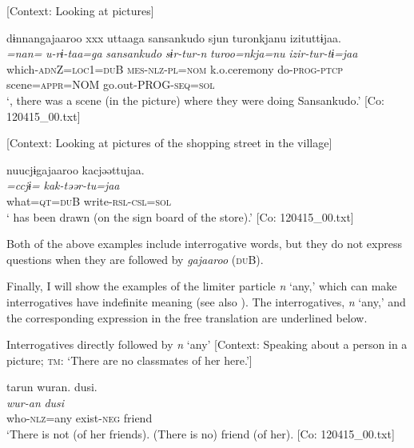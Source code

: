 \ea \label{ex:5:40}  \ea \label{ex:5:40a} [Context: Looking at pictures]

\glll  dɨnnangajaaroo  xxx  uttaaga  {\textbar}sansankudo{\textbar}   sjun  turonkjanu  izituttɨjaa.\footnotemark\\
\textit{=nan=}    \textit{u-rɨ-taa=ga}  \textit{sansankudo}   \textit{sɨr-tur-n}  \textit{turoo=nkja=nu}  \textit{izir-tur-tɨ=jaa}\\
which-\textsc{adn}Z=\textsc{loc}1=\textsc{du}B    \textsc{mes}-\textsc{nlz}-\textsc{pl}=\textsc{nom}  k.o.ceremony   do-\textsc{prog}-\textsc{ptcp}  scene=\textsc{appr}=NOM  go.out-PROG-\textsc{seq}=\textsc{sol}      \\
\glt ‘, there was a scene (in the picture) where they were doing Sansankudo.’ [Co: 120415\_00.txt]

 \ex \label{ex:5:b} [Context: Looking at pictures of the shopping street in the village]

\glll  nuucjɨgajaaroo  kacjəəttujaa.\\
\textit{=ccjɨ=}  \textit{kak-təər-tu=jaa}\\
what=\textsc{qt}=\textsc{du}B  write-\textsc{rsl}-\textsc{csl}=\textsc{sol}\\
\glt ‘ has been drawn (on the sign board of the store).’ [Co: 120415\_00.txt]
\z
\z

Both of the above examples include interrogative words, but they do not express questions when they are followed by \textit{gajaaroo} (\textsc{du}B).

  Finally, I will show the examples of the limiter particle \textit{n} ‘any,’ which can make interrogatives have indefinite meaning (see also ). The interrogatives, \textit{n} ‘any,’ and the corresponding expression in the free translation are underlined below.

\ea \label{ex:5:41}   Interrogatives directly followed by \textit{n} ‘any’
 \ea \label{ex:5:41a} [Context: Speaking about a person in a picture; \textsc{tm}: ‘There are no classmates of her here.’]

\glll  tarun  wuran.  dusi.\\
\textit{}  \textit{wur-an}  \textit{dusi}\\
who-\textsc{nlz}=any  exist-\textsc{neg}  friend\\
\glt ‘There is not  (of her friends). (There is no) friend (of her). [Co: 120415\_00.txt]

